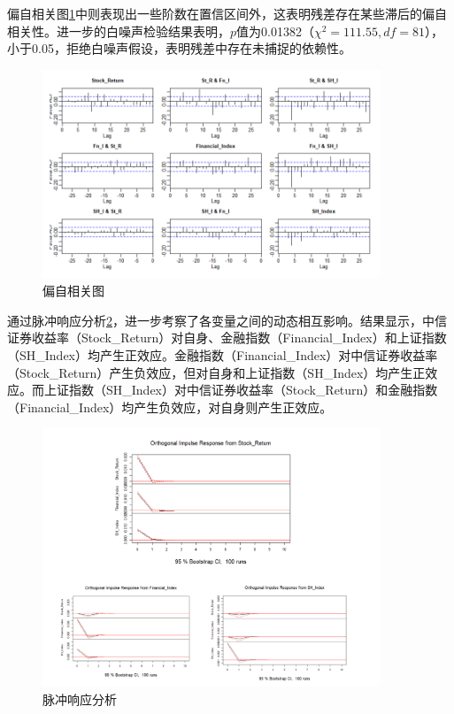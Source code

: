 \documentclass[12pt]{article}
\begin{document}
偏自相关图\ref{fig:偏}中则表现出一些阶数在置信区间外，这表明残差存在某些滞后的偏自相关性。进一步的白噪声检验结果表明，$p$值为0.01382（$\chi^2 = 111.55, df = 81$），小于0.05，拒绝白噪声假设，表明残差中存在未捕捉的依赖性。

\begin{figure}[H]
\centering
\includegraphics[width=0.9\textwidth]{VAR2.png}
\caption{偏自相关图}
\label{fig:偏}
\end{figure}


通过脉冲响应分析\ref{fig:麦}，进一步考察了各变量之间的动态相互影响。结果显示，中信证券收益率（Stock\_Return）对自身、金融指数（Financial\_Index）和上证指数（SH\_Index）均产生正效应。金融指数（Financial\_Index）对中信证券收益率（Stock\_Return）产生负效应，但对自身和上证指数（SH\_Index）均产生正效应。而上证指数（SH\_Index）对中信证券收益率（Stock\_Return）和金融指数（Financial\_Index）均产生负效应，对自身则产生正效应。

\begin{figure}[H]
\centering
\includegraphics[width=0.9\textwidth]{VAR3.png}
\caption{脉冲响应分析}
\label{fig:麦}
\end{figure}
\end{document}
